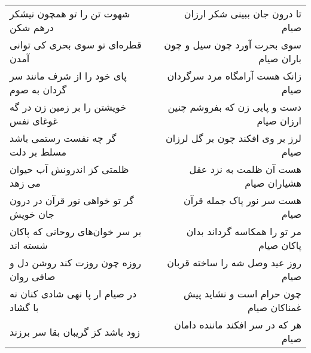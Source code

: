 \begin{center}
\begin{longtable}{l p{0.5cm} r}
\\
شهوت تن را تو همچون نیشکر درهم شکن
&&
تا درون جان ببینی شکر ارزان صیام
\\
قطره‌ای تو سوی بحری کی توانی آمدن
&&
سوی بحرت آورد چون سیل و چون باران صیام
\\
پای خود را از شرف مانند سر گردان به صوم
&&
زانک هست آرامگاه مرد سرگردان صیام
\\
خویشتن را بر زمین زن در گه غوغای نفس
&&
دست و پایی زن که بفروشم چنین ارزان صیام
\\
گر چه نفست رستمی باشد مسلط بر دلت
&&
لرز بر وی افکند چون بر گل لرزان صیام
\\
ظلمتی کز اندرونش آب حیوان می زهد
&&
هست آن ظلمت به نزد عقل هشیاران صیام
\\
گر تو خواهی نور قرآن در درون جان خویش
&&
هست سر نور پاک جمله قرآن صیام
\\
بر سر خوان‌های روحانی که پاکان شسته اند
&&
مر تو را همکاسه گرداند بدان پاکان صیام
\\
روزه چون روزت کند روشن دل و صافی روان
&&
روز عید وصل شه را ساخته قربان صیام
\\
در صیام ار پا نهی شادی کنان نه با گشاد
&&
چون حرام است و نشاید پیش غمناکان صیام
\\
زود باشد کز گریبان بقا سر برزند
&&
هر که در سر افکند ماننده دامان صیام
\\
\end{longtable}
\end{center}
